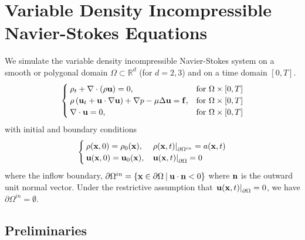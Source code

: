 \documentclass[letterpaper]{erdc}
\begin{document}
\chapter{Variable Density Incompressible Navier-Stokes Equations}
We simulate the variable density incompressible Navier-Stokes system on a smooth or polygonal domain $\Omega\subset \mathbb{R}^d$ (for $d=2,3$) and on a time domain $[0,T]$.
\begin{equation}\label{eqn:variabledensityNavierStokes}
  \begin{cases}
    \rho_t + \nabla\cdot\left( \rho \textbf{u}\right) = 0, & \mbox{for }\Omega\times[0,T]\\
    \rho\left(\textbf{u}_t + \textbf{u}\cdot\nabla\textbf{u}  \right) + \nabla p - \mu\Delta \textbf{u} = \mathbf{f}, &\mbox{for }\Omega\times[0,T]\\
    \nabla\cdot \textbf{u} = 0, &\mbox{for } \Omega\times[0,T]
  \end{cases}
\end{equation}
with initial and boundary conditions
\begin{equation}\label{eqn:variabledensityNavierStokesBCIC}
  \begin{cases}
    \rho(\textbf{x},0) = \rho_0(\textbf{x}), & \left.\rho(\textbf{x},t)\right|_{\partial\Omega^{in}} = a(\textbf{x},t)\\
    \textbf{u}(\textbf{x},0) = \textbf{u}_0(\textbf{x}), & \left.\textbf{u}(\textbf{x},t)\right|_{\partial\Omega} = 0
  \end{cases}
\end{equation}
where the inflow boundary, $\partial\Omega^{in} = \{ \textbf{x}\in \partial\Omega \:|\: \textbf{u}\cdot\textbf{n} <0 \}$ where $\textbf{n}$ is the outward unit normal vector.  Under the restrictive assumption that $\left.\textbf{u}(\textbf{x},t)\right|_{\partial\Omega} = 0$, we have $\partial\Omega^{in}= \emptyset$.


%
%
%
\section{Preliminaries}


%
%
\end{document}
